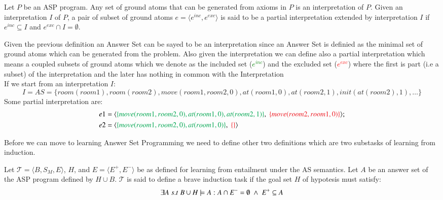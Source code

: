 \begin{tcolorbox}[colback=red!5!white,colframe=red!75!black,title=\textbf{Definition 5: Partial interpretation}]
Let $P$ be an ASP program. Any set of ground atoms that can be generated from axioms in $P$ is an interpretation of $P$.
Given an interpretation $I$ of $P$, a pair of subset of ground atoms $e=\langle e^{inc}, e^{exc}\rangle$ is said to be a partial
interpretation extended by interpretation $I$ if $e^{inc} \subseteq I$ and  $e^{exc} \cap I = \emptyset.$
\end{tcolorbox}

Given the previous definition an Answer Set can be sayed to be an interpretation since an Answer Set is definied as 
the minimal set of ground atoms which can be generated from the problem.
Also given the interpretation we can define also a partial interpretation which means a coupled subsets of ground atoms which we 
denote as the included set (\textcolor{Green}{$e^{inc}$}) and the excluded set (\textcolor{Red}{$e^{exc}$}) where the first is part
(i.e a subset) of the interpretation and the later has nothing in common with the Interpretation\\

If we start from an interpretation $I$:
\begin{equation*}
    I = AS = \{room(room1), room(room2), move(room1,room2,0), at(room1,0), at(room2,1), init(at(room2),1), \ldots\}
\end{equation*}
Some partial interpretation are:
\begin{align*}
    e1 &= \langle\textcolor{Green}{\{move(room1,room2,0), at(room1,0),at(room2,1)\}},\; \textcolor{Red}{\{move(room2,room1,0)\}}\rangle;\\
e2 &= \langle\textcolor{Green}{\{move(room1,room2,0), at(room1,0)\}},\;\textcolor{Red}{\{\}}\rangle
\end{align*}

Before we can move to learning Answer Set Programming we need to define other two definitions which are two substasks of learning from induction.
\begin{tcolorbox}[colback=red!5!white,colframe=red!75!black,title=\textbf{Definition 6: Brave Induction task}]
Let $\mathcal{T}=\langle B,S_M, E\rangle$, $H$, and $E=\langle E^+,E^- \rangle$ be as defined for learning from entailment 
under the AS semantics. Let $A$ be an answer set of the ASP program defined by $H \cup B$.
$\mathcal{T}$ is said to define a brave induction task if the goal set $H$ of hypotesis must satisfy:
\begin{equation*}
    \exists A\;s.t\;B \cup H \models A: A\cap E^- =\emptyset\;\land\;E^+\subseteq A
\end{equation*}
\end{tcolorbox}


